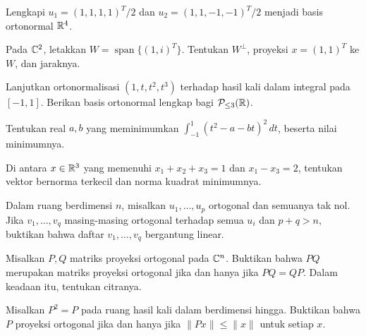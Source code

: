 \begin{latihan}\label{ortho:lat-lengkapi}
    Lengkapi $u_1=(1,1,1,1)^T/2$ dan $u_2=(1,1,-1,-1)^T/2$
    menjadi basis ortonormal $\mathbb{R}^4$.
\end{latihan}

\begin{latihan}\label{ortho:lat-kompleks}
    Pada $\mathbb{C}^2$, letakkan $W=\operatorname{span}\{(1,i)^T\}$.
    Tentukan $W^\perp$, proyeksi $x=(1,1)^T$ ke $W$, dan jaraknya.
\end{latihan}

\begin{latihan}\label{ortho:lat-polinom}
    Lanjutkan ortonormalisasi $(1,t,t^2,t^3)$ terhadap hasil
    kali dalam integral pada $[-1,1]$. Berikan basis ortonormal
    lengkap bagi $\mathcal P_{\le3}(\mathbb{R})$.
\end{latihan}

\begin{latihan}\label{ortho:lat-kuadratik}
    Tentukan real $a,b$ yang meminimumkan
    $\int_{-1}^1(t^2-a-bt)^2\,dt$, beserta nilai minimumnya.
\end{latihan}

\begin{latihan}\label{ortho:lat-kendala}
    Di antara $x\in\mathbb{R}^3$ yang memenuhi
    $x_1+x_2+x_3=1$ dan $x_1-x_3=2$, tentukan vektor bernorma
    terkecil dan norma kuadrat minimumnya.
\end{latihan}

\begin{latihan}\label{ortho:lat-dimensi}
    Dalam ruang berdimensi $n$, misalkan $u_1,\ldots,u_p$
    ortogonal dan semuanya tak nol. Jika $v_1,\ldots,v_q$
    masing-masing ortogonal terhadap semua $u_i$ dan $p+q>n$,
    buktikan bahwa daftar $v_1,\ldots,v_q$ bergantung linear.
\end{latihan}

\begin{latihan}\label{ortho:lat-dua-proyeksi}
    Misalkan $P,Q$ matriks proyeksi ortogonal pada $\mathbb{C}^n$.
    Buktikan bahwa $PQ$ merupakan matriks proyeksi ortogonal
    jika dan hanya jika $PQ=QP$. Dalam keadaan itu, tentukan citranya.
\end{latihan}

\begin{latihan}\label{ortho:lat-kontraksi}
    Misalkan $P^2=P$ pada ruang hasil kali dalam berdimensi hingga.
    Buktikan bahwa $P$ proyeksi ortogonal jika dan hanya jika
    $\|Px\|\le\|x\|$ untuk setiap $x$.
\end{latihan}

